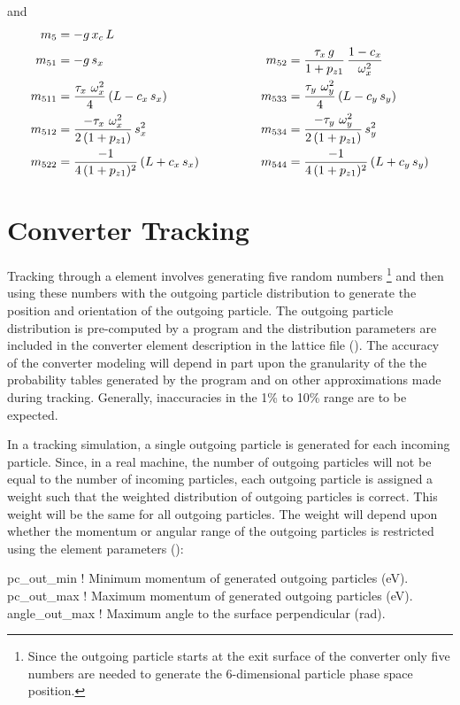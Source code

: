 and
\begin{alignat}{2}
  m_5     &= -g \, x_c \, L & \qquad \qquad & \nonumber \\
  m_{51}  &= -g \, s_x & \qquad \qquad
  m_{52}  &= \frac{\tau_x \, g}{1 + p_{z1}} \, \frac{1 - c_x}{\omega_x^2} \nonumber \\
  m_{511} &= \frac{\tau_x \,\, \omega_x^2}{4} \, (L - c_x \, s_x) & \qquad \qquad
  m_{533} &= \frac{\tau_y \,\, \omega_y^2}{4} \, (L - c_y \, s_y) \nonumber \\
  m_{512} &= \frac{-\tau_x \,\, \omega_x^2}{2 \, (1 + p_{z1})} \, s_x^2 & \qquad \qquad
  m_{534} &= \frac{-\tau_y \,\, \omega_y^2}{2 \, (1 + p_{z1})} \, s_y^2 \nonumber \\
  m_{522} &= \frac{-1}{4 \, (1 + p_{z1})^2} \, (L + c_x \, s_x) & \qquad \qquad
  m_{544} &= \frac{-1}{4 \, (1 + p_{z1})^2} \, (L + c_y \, s_y) \nonumber
\end{alignat}

\section{Converter Tracking}
\label{s:converter.track}

Tracking through a  element involves generating five random numbers
  \footnote{
Since the outgoing particle starts at the exit surface of the converter only five numbers
are needed to generate the 6-dimensional particle phase space position.
  }
and then using these numbers with the outgoing particle distribution to generate the position and
orientation of the outgoing particle. The outgoing particle distribution is pre-computed by a
program  and the distribution parameters are included in the
converter element description in the \bmad lattice file (). The accuracy of the
converter modeling will depend in part upon the granularity of the the probability tables generated
by the  program and on other approximations made during
tracking. Generally, inaccuracies in the 1\% to 10\% range are to be expected.

In a tracking simulation, a single outgoing particle is generated for each incoming particle. Since,
in a real machine, the number of outgoing particles will not be equal to the number of incoming
particles, each outgoing particle is assigned a weight such that the weighted distribution of
outgoing particles is correct. This weight will be the same for all outgoing particles. The weight
will depend upon whether the momentum or angular range of the outgoing particles is restricted using
the element parameters ():
\begin{example}
  pc_out_min    ! Minimum momentum of generated outgoing particles (eV).
  pc_out_max    ! Maximum momentum of generated outgoing particles (eV).
  angle_out_max ! Maximum angle to the surface perpendicular (rad).
\end{example}

